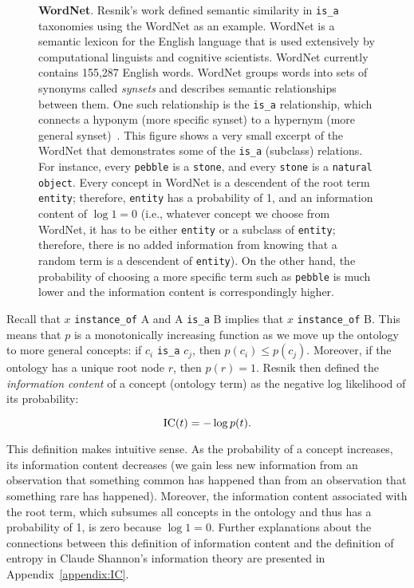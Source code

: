 \documentclass{article}
\begin{document}
\begin{figure}[ht!]
 \caption[Wordnet]{\textbf{WordNet}. Resnik's work defined semantic 
   similarity in \texttt{is\_a} taxonomies 
using the WordNet as an example. WordNet is a 
semantic lexicon for the English language that is used extensively by 
computational linguists and cognitive scientists. WordNet currently  
contains 155,287 English words. WordNet groups words 
into sets of synonyms called \textit{synsets} and describes semantic 
relationships between them. One such relationship is the \texttt{is\_a} 
relationship, which connects a hyponym (more specific synset) to a 
hypernym (more general synset)~\cite{Miller1995}.  
This figure shows a very small excerpt of the WordNet that 
demonstrates some of the \texttt{is\_a} 
   (subclass) relations. For instance, every \texttt{pebble} 
   is a \texttt{stone}, and every \texttt{stone} is a \texttt{natural 
     object}. Every concept in WordNet is a descendent of the root 
   term \texttt{entity}; therefore, \texttt{entity} has a probability 
   of 1, and an information content of $\log 1=0$ (i.e., whatever 
   concept we choose  
from WordNet, it has to be 
   either \texttt{entity} or a subclass of \texttt{entity}; therefore, 
   there is no added information from knowing that a random term is a 
   descendent of \texttt{entity}). On the other hand, 
   the probability of choosing a more specific term such as 
   \texttt{pebble} is much lower and the information content is 
   correspondingly higher. } 
 \label{fig:wordnet} 
\end{figure} 
 
 
Recall that $x$ 
\verb!instance_of! A and A \verb!is_a! B implies that $x$ 
\verb!instance_of! B. This means that $p$ is a monotonically 
increasing function as we move up the ontology to more general 
concepts: if $c_i$ \verb!is_a! $c_j$, then $p(c_i)\leq 
p(c_j)$. Moreover, if the ontology has a unique root node $r$, then 
$p(r)=1$. Resnik then defined the \textit{information content} of a 
concept (ontology term) as the negative log likelihood of its 
probability: 
 
\begin{equation} 
\textnormal{IC}(t)=-\log p(t). 
\label{eqn:ic} 
\end{equation} 
 
This definition makes intuitive sense. As the probability of a concept 
increases, its information content decreases (we gain  less new 
information from an observation that something common has happened 
than from an observation that something rare has happened). Moreover, 
the information content associated with the root term, which subsumes 
all concepts in the ontology and thus has a probability of 1, is zero 
because $\log 1 = 0$. Further explanations about the connections 
between this definition of information content and the definition of 
entropy in Claude Shannon's information theory are presented in 
Appendix~\ref{appendix:IC}.  
 
\end{document}
